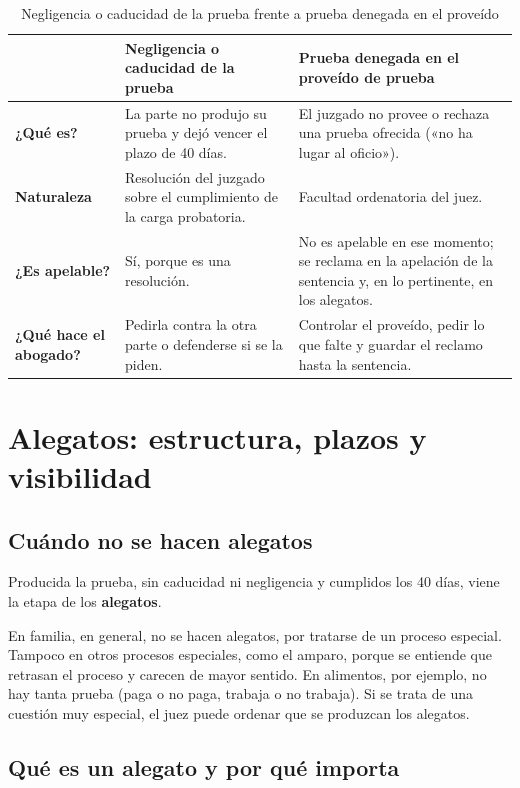 \documentclass[12pt,oneside]{book}
\begin{document}
\begin{table}[H]
\centering
\caption{Negligencia o caducidad de la prueba frente a prueba denegada en el proveído}
\begin{tabularx}{\textwidth}{L{0.17\textwidth} Y Y}
\toprule
 & \textbf{Negligencia o caducidad de la prueba} & \textbf{Prueba denegada en el proveído de prueba} \\
\midrule
\textbf{¿Qué es?} & La parte no produjo su prueba y dejó vencer el plazo de 40 días. & El juzgado no provee o rechaza una prueba ofrecida («no ha lugar al oficio»). \\
\addlinespace
\textbf{Naturaleza} & Resolución del juzgado sobre el cumplimiento de la carga probatoria. & Facultad ordenatoria del juez. \\
\addlinespace
\textbf{¿Es apelable?} & Sí, porque es una resolución. & No es apelable en ese momento; se reclama en la apelación de la sentencia y, en lo pertinente, en los alegatos. \\
\addlinespace
\textbf{¿Qué hace el abogado?} & Pedirla contra la otra parte o defenderse si se la piden. & Controlar el proveído, pedir lo que falte y guardar el reclamo hasta la sentencia. \\
\bottomrule
\end{tabularx}
\end{table}

\section{Alegatos: estructura, plazos y visibilidad}

\subsection{Cuándo no se hacen alegatos}

Producida la prueba, sin caducidad ni negligencia y cumplidos los 40 días, viene la etapa de los \textbf{alegatos}.

En familia, en general, no se hacen alegatos, por tratarse de un proceso especial. Tampoco en otros procesos especiales, como el amparo, porque se entiende que retrasan el proceso y carecen de mayor sentido. En alimentos, por ejemplo, no hay tanta prueba (paga o no paga, trabaja o no trabaja). Si se trata de una cuestión muy especial, el juez puede ordenar que se produzcan los alegatos.

\subsection{Qué es un alegato y por qué importa}
\end{document}
